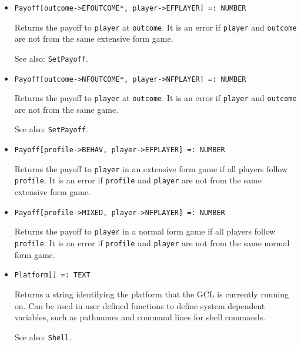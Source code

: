 \begin{itemize}
\item{}
\protect \large \begin{verbatim}
Payoff[outcome->EFOUTCOME*, player->EFPLAYER] =: NUMBER 
\end{verbatim}\normalsize
\bd
Returns the payoff to \verb+player+ at \verb+outcome+.  It is an error if
\verb+player+ and \verb+outcome+ are not from the same extensive form game.
\item [See also:] \verb+SetPayoff+.
\ed

\item{}
\protect \large \begin{verbatim}
Payoff[outcome->NFOUTCOME*, player->NFPLAYER] =: NUMBER 
\end{verbatim}\normalsize

\bd
Returns the payoff to \verb+player+ at \verb+outcome+.  It is an error if
\verb+player+ and \verb+outcome+ are not from the same game.
\item [See also:] \verb+SetPayoff+.
\ed

\item{}
\protect \large \begin{verbatim}
Payoff[profile->BEHAV, player->EFPLAYER] =: NUMBER 
\end{verbatim}\normalsize

\bd
Returns the payoff to \verb+player+ in an extensive form game if all
players follow \verb+profile+.  It is an error if \verb+profile+
and \verb+player+ are not from the same extensive form game.
\ed

\item{}
\protect \large \begin{verbatim}
Payoff[profile->MIXED, player->NFPLAYER] =: NUMBER 
\end{verbatim}\normalsize

\bd
Returns the payoff to \verb+player+ in a normal form game if all players
follow \verb+profile+.  It is an error if \verb+profile+ and \verb+player+
are not from the same normal form game.
\ed

\item{}
\protect \large \begin{verbatim}
Platform[] =: TEXT 
\end{verbatim} \normalsize

\bd 
Returns a string identifying the platform that the GCL is
currently running on.  Can be used in user defined functions to define
system dependent variables, such as pathnames and command lines for
shell commands.  
\item [See also:] \verb+Shell+.
\ed


\end{itemize}
